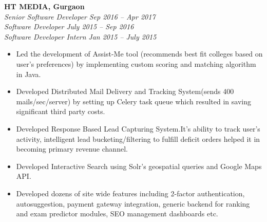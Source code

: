\documentclass[margin,line]{resume}
\begin{document}
\begin{resume}
    \textbf{HT MEDIA, Gurgaon}\\
           \textsl{Senior Software Developer} \hfill \textsl{Sep 2016 -- Apr 2017} \vspace{0mm}\\\vspace{0mm}%
           \textsl{Software Developer} \hfill \textsl{July 2015 -- Sep 2016} \vspace{0mm}\\\vspace{0mm}%
           \textsl{Software Developer Intern} \hfill \textsl{Jan 2015 -- July 2015} \vspace{1mm}%
    \begin{itemize}
            \item Led the development of Assist-Me tool (recommends best fit colleges based on user's preferences) by implementing custom scoring and matching algorithm in Java.
            \item Developed Distributed Mail Delivery and Tracking System(sends 400 mails/sec/server) by setting up Celery task queue which resulted in saving significant third party costs.
            \item Developed Response Based Lead Capturing System.It's ability to track user's activity, intelligent lead bucketing/filtering to fulfill deficit orders helped it in becoming primary revenue channel.

            \item Developed Interactive Search using Solr's geospatial queries and Google Maps API.
            \item Developed dozens of site wide features including 2-factor authentication, autosuggestion, payment gateway integration, generic backend for ranking and exam predictor modules, SEO management dashboards etc.


\end{itemize}
\end{resume}
\end{document}
